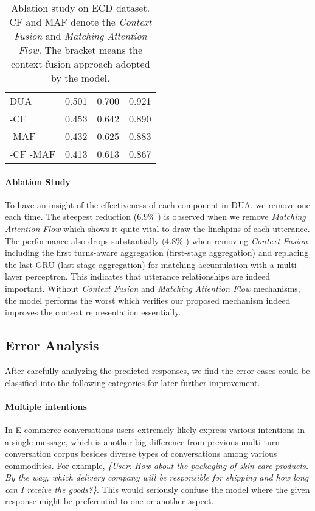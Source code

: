 \documentclass[11pt]{article}
\begin{document}
\begin{table}[t]
	\centering
	{
		\begin{tabular}{l|l|l|l}
			\hline
			
			\hline
			&&  &  \\
			\hline
			DUA & 0.501 & 0.700  & 0.921   \\
			-CF & 0.453 & 0.642 & 0.890    \\
			-MAF  & 0.432 & 0.625 & 0.883 \\
			-CF -MAF & 0.413 & 0.613 & 0.867     \\
			\hline
			
			\hline
		\end{tabular}
		
	}
	\caption{\label{tab:abs_ecd} Ablation study on ECD dataset. CF and MAF denote the \emph{Context Fusion} and \emph{Matching Attention Flow}. The bracket means the context fusion approach adopted by the model.}
\end{table}


\paragraph{Ablation Study}

To have an insight of the effectiveness of each component in DUA, we remove one each time. The steepest reduction (6.9\% ) is observed when we remove \emph{Matching Attention Flow} which shows it quite vital to draw the linchpins of each utterance. The performance also drops substantially (4.8\% ) when removing \emph{Context Fusion} including the first turns-aware aggregation (first-stage aggregation) and replacing the last GRU (last-stage aggregation) for matching accumulation with a multi-layer perceptron. This indicates that utterance relationships are indeed important. Without \emph{Context Fusion} and \emph{Matching Attention Flow} mechanisms, the model performs the worst which verifies our proposed mechanism indeed improves the context representation essentially.

\subsection{Error Analysis}
After carefully analyzing the predicted responses, we find the error cases could be classified into the following categories for later further improvement.


\paragraph{Multiple intentions}
In E-commerce conversations users extremely likely express various intentions in a single message, which is another big difference from previous multi-turn conversation corpus besides diverse types of conversations among various commodities. For example, \emph{\{User: How about the packaging of skin care products. By the way, which delivery company will be responsible for shipping and how long can I receive the goods?\}}. This would seriously confuse the model where the given response might be preferential to one or another aspect.
\end{document}
